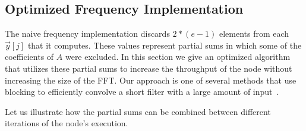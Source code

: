 \subsection{Optimized Frequency Implementation}

The naive frequency implementation discards $2*(e-1)$ elements from
each ${\vec y}[j]$ that it computes.  These values represent partial
sums in which some of the coefficients of $A$ were excluded.  In this
section we give an optimized algorithm that utilizes these partial
sums to increase the throughput of the node without increasing the
size of the FFT.  Our approach is one of several methods that use
blocking to efficiently convolve a short filter with a large amount of
input~\cite{oppenheim-discrete}.

Let us illustrate how the partial sums can be combined between
different iterations of the node's execution.  \\ 



